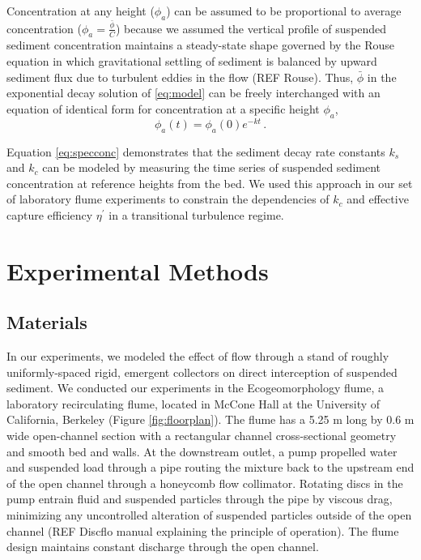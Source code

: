 \documentclass{scrreprt}
\begin{document}
Concentration at any height ($\phi_a$) can be assumed to be proportional to average concentration ($\phi_a=\frac{\bar{\phi}}{C}$) because we assumed the vertical profile of suspended sediment concentration maintains a steady-state shape governed by the Rouse equation in which gravitational settling of sediment is balanced by upward sediment flux due to turbulent eddies in the flow (REF Rouse). Thus, $\bar{\phi}$ in the exponential decay solution of \eqref{eq:model} can be freely interchanged with an equation of identical form for concentration at a specific height $\phi_a$,
\begin{equation}
    \phi_a(t) = \phi_a(0)e^{-kt}\,.
    \label{eq:specconc}
\end{equation}

Equation \eqref{eq:specconc} demonstrates that the sediment decay rate constants $k_s$ and $k_c$ can be modeled by measuring the time series of suspended sediment concentration at reference heights from the bed. We used this approach in our set of laboratory flume experiments to constrain the dependencies of $k_c$ and effective capture efficiency $\eta^\prime$ in a transitional turbulence regime.

\section{Experimental Methods}

\subsection{Materials}

In our experiments, we modeled the effect of flow through a stand of roughly uniformly-spaced rigid, emergent collectors on direct interception of suspended sediment. We conducted our experiments in the Ecogeomorphology flume, a laboratory recirculating flume, located in McCone Hall at the University of California, Berkeley (Figure \ref{fig:floorplan}). The flume has a 5.25 m long by 0.6 m wide open-channel section with a rectangular channel cross-sectional geometry and smooth bed and walls. At the downstream outlet, a pump propelled water and suspended load through a pipe routing the mixture back to the upstream end of the open channel through a honeycomb flow collimator. Rotating discs in the pump entrain fluid and suspended particles through the pipe by viscous drag, minimizing any uncontrolled alteration of suspended particles outside of the open channel (REF Discflo manual explaining the principle of operation). The flume design maintains constant discharge through the open channel.
\end{document}
